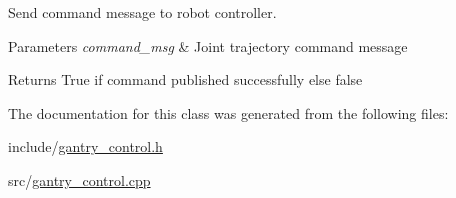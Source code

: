 Send command message to robot controller. 


\begin{DoxyParams}{Parameters}
{\em command\+\_\+msg} & Joint trajectory command message \\
\hline
\end{DoxyParams}
\begin{DoxyReturn}{Returns}
True if command published successfully else false 
\end{DoxyReturn}


The documentation for this class was generated from the following files\+:\begin{DoxyCompactItemize}
\item 
include/\hyperlink{gantry__control_8h}{gantry\+\_\+control.\+h}\item 
src/\hyperlink{gantry__control_8cpp}{gantry\+\_\+control.\+cpp}\end{DoxyCompactItemize}
